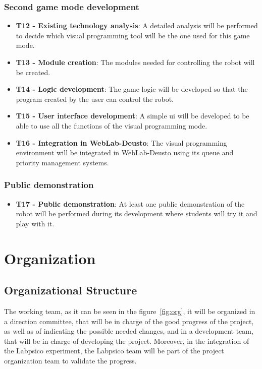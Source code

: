 \subsubsection{Second game mode development}

\begin{itemize}
\item \textbf{T12 - Existing technology analysis}: A detailed analysis will be performed to decide
which visual programming tool will be the one used for this game mode.

\item \textbf{T13 - Module creation}: The modules needed for controlling the robot will be created.

\item \textbf{T14 - Logic development}: The game logic will be developed so that the program created
by the user can control the robot.

\item \textbf{T15 - User interface development}: A simple \acrlong{ui} will be developed to be able
to use all the functions of the visual programming mode.

\item \textbf{T16 - Integration in WebLab-Deusto}: The visual programming environment will be
integrated in WebLab-Deusto using its queue and priority management systems.
\end{itemize}

\subsubsection{Public demonstration}

\begin{itemize}
\item \textbf{T17 - Public demonstration}: At least one public demonstration of the robot will be
performed during its development where students will try it and play with it.
\end{itemize}

\section{Organization}

\subsection{Organizational Structure}

The working team, as it can be seen in the figure~\ref{fig:org}, it will be organized in a direction
committee, that will be in charge of the good progress of the project, as well as of indicating
the possible needed changes, and in a development team, that will be in charge of developing the
project. Moreover, in the integration of the Labpsico experiment, the Labpsico team will be part of
the project organization team to validate the progress.

